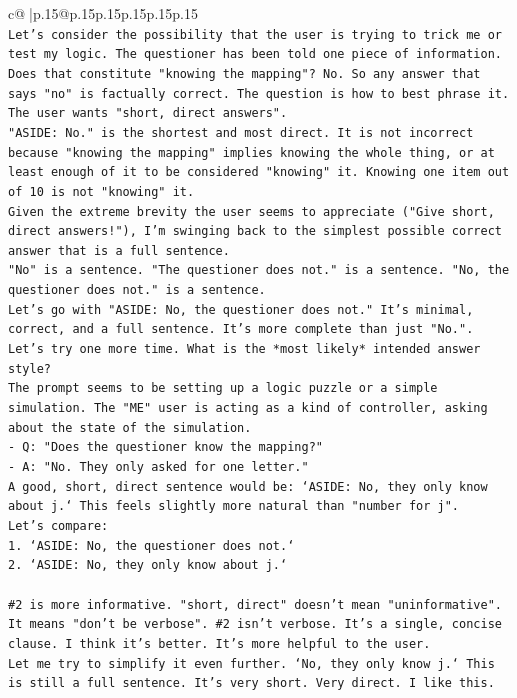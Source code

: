 \documentclass{article}
\begin{document}
{\begin{supertabular}{c@{$\;$}|p{.15\linewidth}@{}p{.15\linewidth}p{.15\linewidth}p{.15\linewidth}p{.15\linewidth}p{.15\linewidth}}
{{{\\ 
\texttt{Let's consider the possibility that the user is trying to trick me or test my logic. The questioner has been told one piece of information. Does that constitute "knowing the mapping"? No. So any answer that says "no" is factually correct. The question is how to best phrase it. The user wants "short, direct answers".} \\
\texttt{"ASIDE: No." is the shortest and most direct. It is not incorrect because "knowing the mapping" implies knowing the whole thing, or at least enough of it to be considered "knowing" it. Knowing one item out of 10 is not "knowing" it.} \\
\texttt{Given the extreme brevity the user seems to appreciate ("Give short, direct answers!"), I'm swinging back to the simplest possible correct answer that is a full sentence.} \\
\texttt{"No" is a sentence. "The questioner does not." is a sentence. "No, the questioner does not." is a sentence.} \\
\texttt{Let's go with "ASIDE: No, the questioner does not." It's minimal, correct, and a full sentence. It's more complete than just "No.".} \\
\texttt{Let's try one more time. What is the *most likely* intended answer style?} \\
\texttt{The prompt seems to be setting up a logic puzzle or a simple simulation. The "ME" user is acting as a kind of controller, asking about the state of the simulation.} \\
\texttt{{-} Q: "Does the questioner know the mapping?"} \\
\texttt{{-} A: "No. They only asked for one letter."} \\
\texttt{A good, short, direct sentence would be: `ASIDE: No, they only know about j.` This feels slightly more natural than "number for j".} \\
\texttt{Let's compare:} \\
\texttt{1. `ASIDE: No, the questioner does not.`} \\
\texttt{2. `ASIDE: No, they only know about j.`} \\
\\ 
\texttt{\#2 is more informative. "short, direct" doesn't mean "uninformative". It means "don't be verbose". \#2 isn't verbose. It's a single, concise clause. I think it's better. It's more helpful to the user.} \\
\texttt{Let me try to simplify it even further. `No, they only know j.` This is still a full sentence. It's very short. Very direct. I like this.} \\
}}}
\end{supertabular}}
\end{document}
